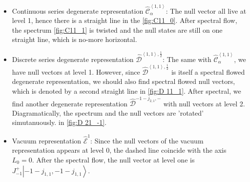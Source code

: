\documentclass[10pt,a4paper]{article}
\numberwithin{equation}{section}
\newcommand{\ket}[1]{\left| #1 \right\rangle}
\newcommand{\vev}[1]{\left\langle #1 \right\rangle}
\begin{document}
\begin{itemize}
    \item Continuous series degenerate representation $\widehat{\mathcal{C}}^{\vev{1,1}}_{\alpha}$: The null vector all live at 
    level 1, hence there is a straight line in the \ref{fig:C11_0}. After spectral flow, the spectrum \ref{fig:C11_1} is twisted and the null states 
    are still on one straight line, which is no-more horizontal.
    \item Discrete series degenerate representation $\widehat{\mathcal{D}}^{\vev{1,1},\frac{1}{2}}$: The same with 
    $\widehat{\mathcal{C}}^{\vev{1,1}}_{\alpha}$, we have null vectors at level 1. However, since $\widehat{\mathcal{D}}^{\vev{1,1},\frac{1}{2}}$
    is itself a spectral flowed degenerate representation, we should also find spectral flowed null vectors, which is denoted by 
    a second straight line in \ref{fig:D 11_1}. After spectral, we find another degenerate representation 
    $\widehat{\mathcal{D}}^{-1 - j_{2,1}, -}$ with null vectors at level 2. Diagramatically, the spectrum and the null vectors are 
    'rotated' simutanuously. in \ref{fig:D 21_-1}.
    \item Vacuum representation $\widehat{\mathcal{E}}^{1}$: Since the null vectors of the vacuum representation appears at level 0, the 
    dashed line coincide with the axis $L_{0} = 0$. After the spectral flow, the null vector at level one is $J^{+}_{-1} \ket{-1-j_{1,1},-1-j_{1,1}}$.
\end{itemize}
\end{document}
